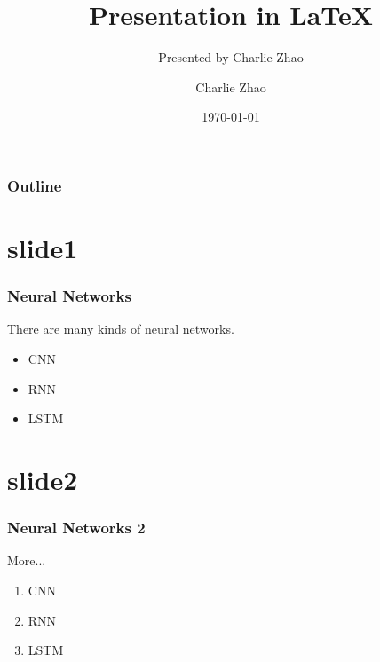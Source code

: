 \documentclass[xcolor=dvipsnames]{beamer}
\title[pre]{Presentation in \LaTeX}
\subtitle[pre by zcc]{Presented by Charlie Zhao}
\author[zcc]{Charlie Zhao}
\date[2018]{\today}
\institute[SJTU]{Shanghai Jiao Tong University}
\begin{document}
        \begin{frame}[t]
            \titlepage
        \end{frame}

        \begin{frame}[t]
            \frametitle{Outline}
            \tableofcontents
        \end{frame}

        \section{slide1}
        \begin{frame}[t]

            \frametitle{Neural Networks}
            There are many kinds of neural networks.

            \begin{itemize}
                \item CNN
                \item RNN
                \item LSTM
            \end{itemize}

        \end{frame}

        \section{slide2}
        \begin{frame}[t]

            \frametitle{Neural Networks 2}
            More...

            \begin{enumerate}
                \item CNN
                \item RNN
                \item LSTM
            \end{enumerate}

        \end{frame}
\end{document}

